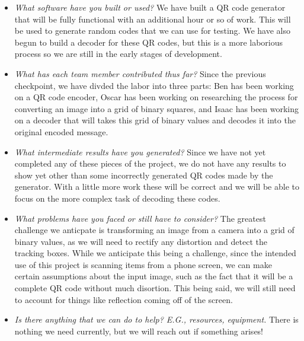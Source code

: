 \begin{itemize}
    \item \emph{What software have you built or used?} We have built a QR code generator that will be fully functional with an additional hour or so of work. This will be used to generate random codes that we can use for testing. We have also begun to build a decoder for these QR codes, but this is a more laborious process so we are still in the early stages of development.
  \item \emph{What has each team member contributed thus far?} Since the previous checkpoint, we have divded the labor into three parts: Ben has been working on a QR code encoder, Oscar has been working on researching the process for converting an image into a grid of binary squares, and Isaac has been working on a decoder that will takes this grid of binary values and decodes it into the original encoded message.
  \item \emph{What intermediate results have you generated?} Since we have not yet completed any of these pieces of the project, we do not have any results to show yet other than some incorrectly generated QR codes made by the generator. With a little more work these will be correct and we will be able to focus on the more complex task of decoding these codes.
  \item \emph{What problems have you faced or still have to consider?} The greatest challenge we anticpate is transforming an image from a camera into a grid of binary values, as we will need to rectify any distortion and detect the tracking boxes. While we anticipate this being a challenge, since the intended use of this project is scanning items from a phone screen, we can make certain assumptions about the input image, such as the fact that it will be a complete QR code without much disortion. This being said, we will still need to account for things like reflection coming off of the screen.
  \item \emph{Is there anything that we can do to help? E.G., resources, equipment.} There is nothing we need currently, but we will reach out if something arises!

\end{itemize}



